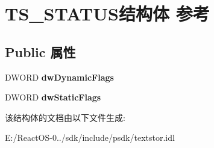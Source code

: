 \hypertarget{struct_t_s___s_t_a_t_u_s}{}\section{T\+S\+\_\+\+S\+T\+A\+T\+U\+S结构体 参考}
\label{struct_t_s___s_t_a_t_u_s}
\subsection*{Public 属性}
\begin{DoxyCompactItemize}
\item 
\mbox{\label{struct_t_s___s_t_a_t_u_s_a477e678d3f6b7a0e15def497b6f62d47}} 
D\+W\+O\+RD {\bfseries dw\+Dynamic\+Flags}
\item 
\mbox{\label{struct_t_s___s_t_a_t_u_s_aa3dc259aa1c45d8c03590d34b919e812}} 
D\+W\+O\+RD {\bfseries dw\+Static\+Flags}
\end{DoxyCompactItemize}


该结构体的文档由以下文件生成\+:\begin{DoxyCompactItemize}
\item 
E\+:/\+React\+O\+S-\/0../sdk/include/psdk/textstor.\+idl\end{DoxyCompactItemize}
